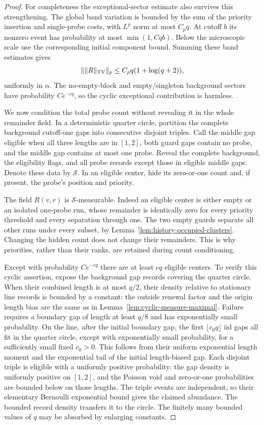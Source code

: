 \documentclass[11pt,letterpaper]{article}
\begin{document}
\begin{proof}
For completeness the exceptional-sector estimate also
survives this strengthening. The global band variation is
bounded by the sum of the priority insertion and single-probe
costs, with $L^p$ norm at most $C_pq$. At cutoff $b$ its
nonzero event has probability at most $\min(1,Cqb)$.
Below the microscopic scale use the corresponding initial
component bound. Summing these band estimates gives
\begin{equation}\label{eq:priority-remainder-polynomial}
 \|\|R\|_{\rm TV}\|_p\le C_pq(1+\log(q+2)),
\end{equation}
uniformly in $\alpha$. The no-empty-block and empty/singleton
background sectors have probability $Ce^{-cq}$, so the
cyclic exceptional contribution is harmless.

We now condition the total probe count without revealing
it in the whole remainder field. In a deterministic quarter
circle, partition the complete background cutoff-one gaps
into consecutive disjoint triples. Call the middle gap
eligible when all three lengths are in $[1,2]$, both guard
gaps contain no probe, and the middle gap contains at most
one probe. Reveal the complete background, the eligibility
flags, and all probe records except those in eligible middle
gaps. Denote these data by $\mathcal S$.
In an eligible center, hide its zero-or-one count and, if
present, the probe's position and priority.

The field $R(v,r)$ is $\mathcal S$-measurable. Indeed an
eligible center is either empty or an isolated one-probe
run, whose remainder is identically zero for every priority
threshold and every separation through one.
The two empty guards separate all other runs under every
subset, by Lemma~\ref{lem:history-occupied-clusters}.
Changing the hidden count does not change their remainders.
This is why priorities, rather than their ranks, are retained
during count conditioning.

Except with probability $Ce^{-cq}$ there are at least $cq$
eligible centers. To verify this cyclic assertion, expose
the background gap records covering the quarter circle.
When their combined length is at most $q/2$, their density
relative to stationary line records is bounded by a constant:
the outside renewal factor and the origin length bias are
the same as in Lemma~\ref{lem:cyclic-measure-maximal}.
Failure requires a boundary gap of length at least $q/8$
and has exponentially small probability.
On the line, after the initial boundary gap, the first
$\lfloor c_0q\rfloor$ iid gaps all fit in the quarter circle,
except with exponentially small probability, for a sufficiently
small fixed $c_0>0$. This follows from their uniform exponential
length moment and the exponential tail of the initial
length-biased gap. Each disjoint triple is eligible with a
uniformly positive probability: the gap density is uniformly
positive on $[1,2]$, and the Poisson void and zero-or-one
probabilities are bounded below on those lengths.
The triple events are independent, so their elementary
Bernoulli exponential bound gives the claimed abundance.
The bounded record density transfers it to the circle.
The finitely many bounded values of $q$ may be absorbed
by enlarging constants.


\end{proof}
\end{document}
